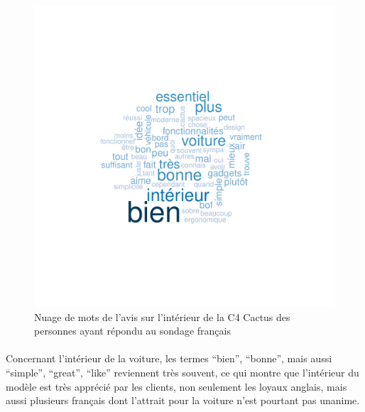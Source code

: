 \documentclass[12pt]{article}\usepackage[]{graphicx}\usepackage[]{color}
\makeatletter
\def\maxwidth{ %
  \ifdim\Gin@nat@width>\linewidth
    \linewidth
  \else
    \Gin@nat@width
  \fi
}
\newenvironment{knitrout}{}{} %
\makeatother
\begin{document}
\begin{knitrout}
\color{fgcolor}\begin{figure}[H]
\includegraphics[width=\maxwidth]{figure/interior_fr-1} \caption[Nuage de mots de l'avis sur l'intérieur de la C4 Cactus des personnes ayant répondu au sondage français]{Nuage de mots de l'avis sur l'intérieur de la C4 Cactus des personnes ayant répondu au sondage français}\label{fig:interior fr}
\end{figure}


\end{knitrout}

%
%

\paragraph{} Concernant l'intérieur de la voiture, les termes ``bien'',
``bonne'', mais aussi ``simple'', ``great'', ``like'' reviennent très souvent, ce
qui montre que l'intérieur du modèle est très apprécié par les clients, non
seulement les loyaux anglais, mais aussi plusieurs français dont l'attrait pour
la voiture n'est pourtant pas unanime.
\end{document}
